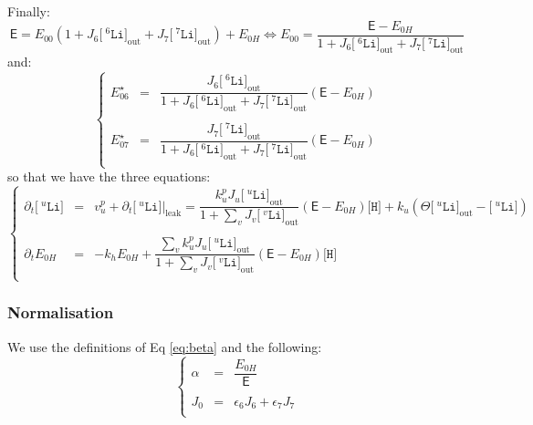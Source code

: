 \documentclass[aps,onecolumn,11pt]{revtex4}
\newcommand{\mychem}[1]{\mathtt{#1}}
\newcommand{\myconc}[1]{\big[#1\big]}
\newcommand{\spLi}[1]{{\!~^{#1}\mychem{Li}}}
\newcommand{\Li}[1]{\myconc{\spLi{#1}}}
\newcommand{\spproton}{\mychem{H}}
\newcommand{\proton}{\myconc{\spproton}}
\newcommand{\myleak}[1]{\left.{#1}\right\vert_{\mathrm{leak}}}
\newcommand{\myout}[1]{{#1}_{\mathrm{out}}}
\newcommand{\LiOut}[1]{\myout{\Li{#1}}}
\newcommand{\LiAll}{\Lambda}
\newcommand{\LiAllOut}{\myout{\LiAll}}
\begin{document}
Finally:
\begin{equation}
\mathsf{E} = E_{00}\left(1+J_6\LiOut{6}+J_7\LiOut{7}\right) + E_{0H} \Leftrightarrow E_{00} = \dfrac{\mathsf{E}-E_{0H}}{1+J_6\LiOut{6}+J_7\LiOut{7}}
\end{equation}
and:
\begin{equation}
\left\lbrace
\begin{array}{rcl}
	E_{06}^\star & = & \dfrac{J_6\LiOut{6}}{1+J_6\LiOut{6}+J_7\LiOut{7}} \left(\mathsf{E}-E_{0H}\right)\\
	\\
	E_{07}^\star & = & \dfrac{J_7\LiOut{7}}{1+J_6\LiOut{6}+J_7\LiOut{7}} \left(\mathsf{E}-E_{0H}\right)\\
\end{array}
\right.
\end{equation}
so that we have the three equations:
\begin{equation}
\left\lbrace
\begin{array}{rcl}
	\partial_t \Li{u}  & = & v^p_u +\partial_t \myleak{\Li{u}}  = \dfrac{k^p_u J_u \LiOut{u}}{1+\sum_v J_v \LiOut{v}} \left(\mathsf{E}-E_{0H}\right) \proton + k_u \left( \Theta \LiOut{u} - \Li{u}\right) \\
	\\
	\partial_t E_{0H} & = & -k_h E_{0H} + \dfrac{\sum_v k^p_u J_u \LiOut{u}}{1+\sum_v J_v \LiOut{v}} \left(\mathsf{E}-E_{0H}\right) \proton \\
\end{array}
\right.
\end{equation}
\subsubsection{Normalisation}
We use the definitions of Eq \eqref{eq:beta} and the following:
\begin{equation}
\left\lbrace
\begin{array}{rcl}
	\alpha  & = & \dfrac{E_{0H}}{\mathsf{E}}\\
	\\
	J_0 & = & \epsilon_6 J_6  + \epsilon_7 J_7 \\
\end{array}
\right.
\end{equation}
\end{document}
